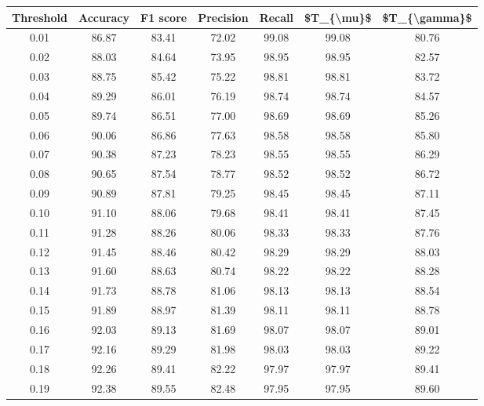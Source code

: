 \begin{tabular}{|c|c|c|c|c|c|c|}
\hline
 Threshold &  Accuracy &  F1 score &  Precision &  Recall &  \$T\_\{\textbackslash mu\}\$ &  \$T\_\{\textbackslash gamma\}\$ \\
\hline
      0.01 &     86.87 &     83.41 &      72.02 &   99.08 &      99.08 &         80.76 \\
      0.02 &     88.03 &     84.64 &      73.95 &   98.95 &      98.95 &         82.57 \\
      0.03 &     88.75 &     85.42 &      75.22 &   98.81 &      98.81 &         83.72 \\
      0.04 &     89.29 &     86.01 &      76.19 &   98.74 &      98.74 &         84.57 \\
      0.05 &     89.74 &     86.51 &      77.00 &   98.69 &      98.69 &         85.26 \\
      0.06 &     90.06 &     86.86 &      77.63 &   98.58 &      98.58 &         85.80 \\
      0.07 &     90.38 &     87.23 &      78.23 &   98.55 &      98.55 &         86.29 \\
      0.08 &     90.65 &     87.54 &      78.77 &   98.52 &      98.52 &         86.72 \\
      0.09 &     90.89 &     87.81 &      79.25 &   98.45 &      98.45 &         87.11 \\
      0.10 &     91.10 &     88.06 &      79.68 &   98.41 &      98.41 &         87.45 \\
      0.11 &     91.28 &     88.26 &      80.06 &   98.33 &      98.33 &         87.76 \\
      0.12 &     91.45 &     88.46 &      80.42 &   98.29 &      98.29 &         88.03 \\
      0.13 &     91.60 &     88.63 &      80.74 &   98.22 &      98.22 &         88.28 \\
      0.14 &     91.73 &     88.78 &      81.06 &   98.13 &      98.13 &         88.54 \\
      0.15 &     91.89 &     88.97 &      81.39 &   98.11 &      98.11 &         88.78 \\
      0.16 &     92.03 &     89.13 &      81.69 &   98.07 &      98.07 &         89.01 \\
      0.17 &     92.16 &     89.29 &      81.98 &   98.03 &      98.03 &         89.22 \\
      0.18 &     92.26 &     89.41 &      82.22 &   97.97 &      97.97 &         89.41 \\
      0.19 &     92.38 &     89.55 &      82.48 &   97.95 &      97.95 &         89.60 \\

\end{tabular}
